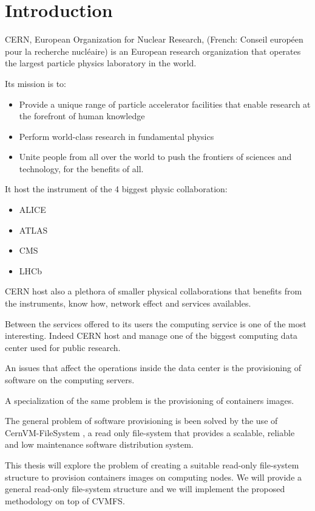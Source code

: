 \chapter{Introduction}\label{ch:introduction}

CERN, European Organization for Nuclear Research, (French: Conseil européen
pour la recherche nucléaire) is an European research organization that operates
the largest particle physics laboratory in the world.

Its mission is to: 
\begin{itemize}
	\item Provide a unique range of particle accelerator facilities that enable research at the forefront of human knowledge
	\item Perform world-class research in fundamental physics
	\item Unite people from all over the world to push the frontiers of sciences and technology, for the benefits of all.
\end{itemize}

It host the instrument of the 4 biggest physic collaboration: 
\begin{itemize}
\item ALICE
\item ATLAS
\item CMS
\item LHCb
\end{itemize}

CERN host also a plethora of smaller physical collaborations that benefits from
the instruments, know how, network effect and services availables.

Between the services offered to its users the computing service is one of the
most interesting. Indeed CERN host and manage one of the biggest computing
data center used for public research.

An issues that affect the operations inside the data center is the provisioning
of software on the computing servers.

A specialization of the same problem is the provisioning of containers images.

The general problem of software provisioning is been solved by the use of
CernVM-FileSystem \cite{cvmfs}, a read only file-system that provides a scalable, reliable
and low maintenance software distribution system.

This thesis will explore the problem of creating a suitable read-only
file-system structure to provision containers images on computing nodes. We
will provide a general read-only file-system structure and we will implement the
proposed methodology on top of CVMFS.

